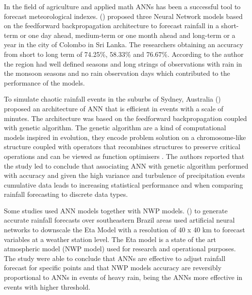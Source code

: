 In the field of agriculture and applied math ANNs has been a successful tool to forecast meteorological indexes. \citeauthor{kumarasiri2006rainfall}  (\citeyear{kumarasiri2006rainfall}) proposed three Neural Network models  based on the feedforward backpropagation architecture to forecast rainfall in a short-term or one day ahead, medium-term or one month ahead and long-term or a year in the city of Colombo in Sri Lanka. The researchers obtaining an accuracy from short to long term of 74.25\%, 58.33\% and 76.67\%. According to the author the region had well defined seasons and long strings of observations with rain in the monsoon seasons and no rain observation days which contributed to the performance of the models. 

To simulate chaotic rainfall events in the suburbs of Sydney, Australia \citeauthor{nasseri2008optimized} (\citeyear{nasseri2008optimized}) proposed an architecture of ANN that is efficient in events with a scale of minutes. The architecture was based on the feedforward backpropagation coupled with genetic algorithm. The genetic algorithm are a kind of computational models inspired in evolution, they encode problem solution on a chromosome-like structure coupled with operators that recombines structures to preserve critical operations and can be viewed as function optimisers \cite{whitley1994genetic}. The authors reported that the study led to conclude that associating ANN with genetic algorithm performed with accuracy and given the high variance and turbulence of precipitation events cumulative data leads to increasing statistical performance and when comparing rainfall forecasting to discrete data types.

Some studies used  ANN models together with NWP models. \citeauthor{ramirez2006linear} (\citeyear{ramirez2006linear}) to generate accurate rainfall forecasts over southeastern Brazil areas used artificial neural networks to downscale the Eta Model with a resolution of 40 x 40 km to forecast variables at a weather station level. The Eta model is a state of the art atmospheric model (NWP model) used for research and operational purposes. The study were able to conclude that ANNs are effective to adjust rainfall forecast for specific points and that NWP models accuracy are reversibly proportional to ANNs in events of heavy rain, being the ANNs more effective in events with higher threshold.

